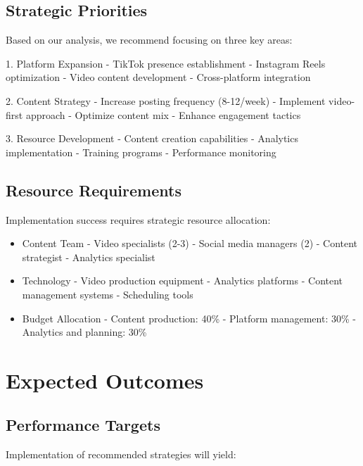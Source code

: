 \documentclass[12pt]{report}
\begin{document}
\section{Strategic Priorities}

Based on our analysis, we recommend focusing on three key areas:

1. Platform Expansion
   - TikTok presence establishment
   - Instagram Reels optimization
   - Video content development
   - Cross-platform integration

2. Content Strategy
   - Increase posting frequency (8-12/week)
   - Implement video-first approach
   - Optimize content mix
   - Enhance engagement tactics

3. Resource Development
   - Content creation capabilities
   - Analytics implementation
   - Training programs
   - Performance monitoring

\section{Resource Requirements}

Implementation success requires strategic resource allocation:

\begin{itemize}
    \item Content Team
        - Video specialists (2-3)
        - Social media managers (2)
        - Content strategist
        - Analytics specialist
    
    \item Technology
        - Video production equipment
        - Analytics platforms
        - Content management systems
        - Scheduling tools
    
    \item Budget Allocation
        - Content production: 40\%
        - Platform management: 30\%
        - Analytics and planning: 30\%
\end{itemize}

\chapter{Expected Outcomes}

\section{Performance Targets}

Implementation of recommended strategies will yield:
\end{document}
